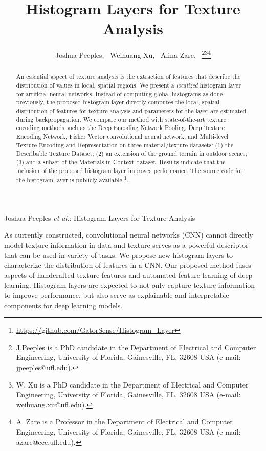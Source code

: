 \documentclass[journal]{IEEEtai}
\begin{document}
\title{Histogram Layers for Texture Analysis} 


\author{Joshua Peeples,~
      Weihuang Xu,~
      Alina Zare,~
\thanks{J.Peeples is a PhD candidate in the Department of Electrical and Computer Engineering, University of Florida, Gainesville, FL, 32608 USA (e-mail: jpeeples@ufl.edu).}\thanks{W. Xu is a PhD candidate in the Department of Electrical and Computer Engineering, University of Florida, Gainesville, FL, 32608 USA (e-mail: weihuang.xu@ufl.edu).}\thanks{A. Zare is a Professor in the Department of Electrical and Computer Engineering, University of Florida, Gainesville, FL, 32608 USA (e-mail: azare@ece.ufl.edu).}}


{Joshua Peeples \MakeLowercase{\textit{et al.}}: Histogram Layers for Texture Analysis}

\maketitle

\begin{abstract}
An essential aspect of texture analysis is the extraction of features that describe the distribution of values in local, spatial regions. We present a \textit{localized} histogram layer for artificial neural networks. Instead of computing global histograms as done previously, the proposed histogram layer directly computes the local, spatial distribution of features for texture analysis and parameters for the layer are estimated during backpropagation. We compare our method with state-of-the-art texture encoding methods such as the Deep Encoding Network Pooling, Deep Texture Encoding Network, Fisher Vector convolutional neural network, and Multi-level Texture Encoding and Representation on three material/texture datasets: (1) the Describable Texture Dataset; (2) an extension of the ground terrain in outdoor scenes; (3) and a subset of the Materials in Context dataset. Results indicate that the inclusion of the proposed histogram layer improves performance. The source code for the histogram layer is publicly available \footnote{\url{https://github.com/GatorSense/Histogram_Layer}}.
\end{abstract}

\begin{IEEEImpStatement}
As currently constructed, convolutional neural networks (CNN) cannot directly model texture information in data and texture serves as a powerful descriptor that can be used in variety of tasks. We propose new histogram layers to characterize the distribution of features in a CNN. Our proposed method fuses aspects of handcrafted texture features and automated feature learning of deep learning. Histogram layers are expected to not only capture texture information to improve performance, but also serve as explainable and interpretable components for deep learning models.
\end{IEEEImpStatement}
\end{document}
